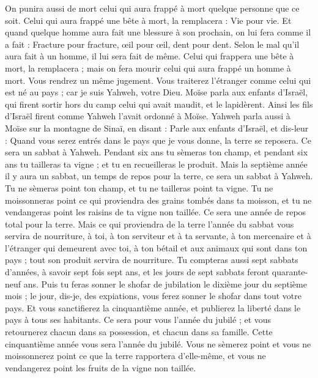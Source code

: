 \begin{multicols}{2}
On punira aussi de mort celui qui aura frappé à mort quelque personne que ce soit.
Celui qui aura frappé une bête à mort, la remplacera : Vie pour vie.
Et quand quelque homme aura fait une blessure à son prochain, on lui fera comme il a fait :
Fracture pour fracture, œil pour œil, dent pour dent. Selon le mal qu'il aura fait à un homme, il lui sera fait de même.
Celui qui frappera une bête à mort, la remplacera ; mais on fera mourir celui qui aura frappé un homme à mort.
Vous rendrez un même jugement. Vous traiterez l'étranger comme celui qui est né au pays ; car je suis Yahweh, votre Dieu.
Moïse parla aux enfants d'Israël, qui firent sortir hors du camp celui qui avait maudit, et le lapidèrent. Ainsi les fils d'Israël firent comme Yahweh l'avait ordonné à Moïse.
\VerseOne{}Yahweh parla aussi à Moïse sur la montagne de Sinaï, en disant :
Parle aux enfants d'Israël, et dis-leur : Quand vous serez entrés dans le pays que je vous donne, la terre se reposera. Ce sera un sabbat à Yahweh.
Pendant six ans tu sèmeras ton champ, et pendant six ans tu tailleras ta vigne ; et tu en recueilleras le produit.
Mais la septième année il y aura un sabbat, un temps de repos pour la terre, ce sera un sabbat à Yahweh. Tu ne sèmeras point ton champ, et tu ne tailleras point ta vigne.
Tu ne moissonneras point ce qui proviendra des grains tombés dans ta moisson, et tu ne vendangeras point les raisins de ta vigne non taillée. Ce sera une année de repos total pour la terre.
Mais ce qui proviendra de la terre l'année du sabbat vous servira de nourriture, à toi, à ton serviteur et à ta servante, à ton mercenaire et à l'étranger qui demeurent avec toi,
à ton bétail et aux animaux qui sont dans ton pays ; tout son produit servira de nourriture.
Tu compteras aussi sept sabbats d'années, à savoir sept fois sept ans, et les jours de sept sabbats feront quarante-neuf ans.
Puis tu feras sonner le shofar de jubilation le dixième jour du septième mois ; le jour, dis-je, des expiations, vous ferez sonner le shofar dans tout votre pays.
Et vous sanctifierez la cinquantième année, et publierez la liberté dans le pays à tous ses habitants. Ce sera pour vous l'année du jubilé ; et vous retournerez chacun dans sa possession, et chacun dans sa famille.
Cette cinquantième année vous sera l'année du jubilé. Vous ne sèmerez point et vous ne moissonnerez point ce que la terre rapportera d'elle-même, et vous ne vendangerez point les fruits de la vigne non taillée.

\end{multicols}
